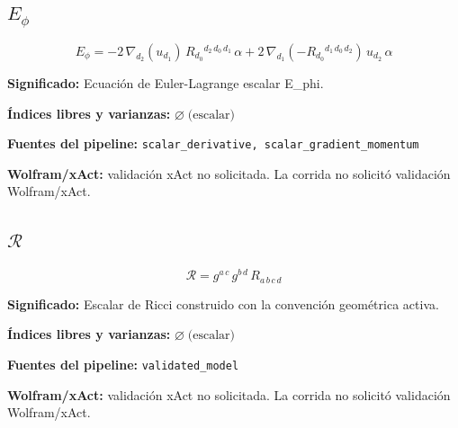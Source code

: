 \documentclass[11pt]{article}
\begin{document}
\subsection*{$ E_{\phi} $}
\begin{dmath*}[breakdepth={5}]
E_{\phi} = -2\,\nabla_{d_{2}}\!\left(u{}_{d_{1}}\right)\,R{}_{d_{0}}{}^{d_{2}\,d_{0}\,d_{1}}\,\alpha + 2\,\nabla_{d_{1}}\!\left(-R{}_{d_{0}}{}^{d_{1}\,d_{0}\,d_{2}}\right)\,u{}_{d_{2}}\,\alpha
\end{dmath*}
\par\vspace{1.2\baselineskip}\noindent
\begin{minipage}{\linewidth}
\textbf{Significado:} Ecuación de Euler-Lagrange escalar E\_phi.\par
\textbf{Índices libres y varianzas:} $ \varnothing\;\text{(escalar)} $\par
\textbf{Fuentes del pipeline:} \texttt{scalar\_derivative, scalar\_gradient\_momentum}\par
\textbf{Wolfram/xAct:} validación xAct no solicitada. La corrida no solicitó validación Wolfram/xAct.\par
\end{minipage}
\subsection*{$ \mathcal{R} $}
\begin{dmath*}[breakdepth={5}]
\mathcal{R} = g{}^{a\,c}\,g{}^{b\,d}\,R{}_{a\,b\,c\,d}
\end{dmath*}
\par\vspace{1.2\baselineskip}\noindent
\begin{minipage}{\linewidth}
\textbf{Significado:} Escalar de Ricci construido con la convención geométrica activa.\par
\textbf{Índices libres y varianzas:} $ \varnothing\;\text{(escalar)} $\par
\textbf{Fuentes del pipeline:} \texttt{validated\_model}\par
\textbf{Wolfram/xAct:} validación xAct no solicitada. La corrida no solicitó validación Wolfram/xAct.\par
\end{minipage}
\end{document}

